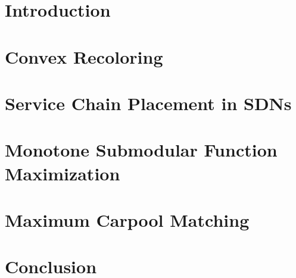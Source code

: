 \newcommand{\defpath}[1]{\def\path{content/#1}}
\newcommand{\add}[1]{}

\chapter{Introduction}
\defpath{introduction}
\add{introduction}

\chapter{Convex Recoloring}
\label{chapter:convex-recoloring}
\defpath{2cr}
\add{2cr}

\chapter{Service Chain Placement in SDNs}
\label{chapter:service-chain-placement-in-sdns}
\defpath{vpn}
\add{vpn}

\chapter{Monotone Submodular Function Maximization}
\label{chapter:monotone-submodular-function-maximization}
\defpath{knapsack}
\add{knapsack}

\chapter{Maximum Carpool Matching}
\label{chapter:maximum-carpool-matching}
\defpath{carpool}
\add{carpool}

\chapter{Conclusion}
\defpath{conclusion}
\add{conclusion}
